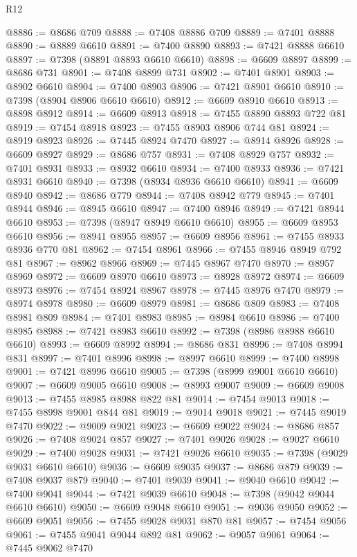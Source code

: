 \begin{lexlean}{R12}
\begin{coremodule}
{{{{{{{{{{{{{{{{{{{{{{{{{{{{{{{{{{{{{{{{{{{{{{{{{{{{{{{{{{{{{{{{{{{{{{{{{{{{{{{{{{@8886 := @8686 @709
@8888 := @7408 @8886 @709
@8889 := @7401 @8888
@8890 := @8889 @6610
@8891 := @7400 @8890
@8893 := @7421 @8888 @6610
@8897 := @7398 (@8891 @8893 @6610 @6610)
@8898 := @6609 @8897
@8899 := @8686 @731
@8901 := @7408 @8899 @731
@8902 := @7401 @8901
@8903 := @8902 @6610
@8904 := @7400 @8903
@8906 := @7421 @8901 @6610
@8910 := @7398 (@8904 @8906 @6610 @6610)
@8912 := @6609 @8910 @6610
@8913 := @8898 @8912
@8914 := @6609 @8913
@8918 := @7455 @8890 @8893 @722 @81
@8919 := @7454 @8918
@8923 := @7455 @8903 @8906 @744 @81
@8924 := @8919 @8923
@8926 := @7445 @8924 @7470
@8927 := @8914 @8926
@8928 := @6609 @8927
@8929 := @8686 @757
@8931 := @7408 @8929 @757
@8932 := @7401 @8931
@8933 := @8932 @6610
@8934 := @7400 @8933
@8936 := @7421 @8931 @6610
@8940 := @7398 (@8934 @8936 @6610 @6610)
@8941 := @6609 @8940
@8942 := @8686 @779
@8944 := @7408 @8942 @779
@8945 := @7401 @8944
@8946 := @8945 @6610
@8947 := @7400 @8946
@8949 := @7421 @8944 @6610
@8953 := @7398 (@8947 @8949 @6610 @6610)
@8955 := @6609 @8953 @6610
@8956 := @8941 @8955
@8957 := @6609 @8956
@8961 := @7455 @8933 @8936 @770 @81
@8962 := @7454 @8961
@8966 := @7455 @8946 @8949 @792 @81
@8967 := @8962 @8966
@8969 := @7445 @8967 @7470
@8970 := @8957 @8969
@8972 := @6609 @8970 @6610
@8973 := @8928 @8972
@8974 := @6609 @8973
@8976 := @7454 @8924 @8967
@8978 := @7445 @8976 @7470
@8979 := @8974 @8978
@8980 := @6609 @8979
@8981 := @8686 @809
@8983 := @7408 @8981 @809
@8984 := @7401 @8983
@8985 := @8984 @6610
@8986 := @7400 @8985
@8988 := @7421 @8983 @6610
@8992 := @7398 (@8986 @8988 @6610 @6610)
@8993 := @6609 @8992
@8994 := @8686 @831
@8996 := @7408 @8994 @831
@8997 := @7401 @8996
@8998 := @8997 @6610
@8999 := @7400 @8998
@9001 := @7421 @8996 @6610
@9005 := @7398 (@8999 @9001 @6610 @6610)
@9007 := @6609 @9005 @6610
@9008 := @8993 @9007
@9009 := @6609 @9008
@9013 := @7455 @8985 @8988 @822 @81
@9014 := @7454 @9013
@9018 := @7455 @8998 @9001 @844 @81
@9019 := @9014 @9018
@9021 := @7445 @9019 @7470
@9022 := @9009 @9021
@9023 := @6609 @9022
@9024 := @8686 @857
@9026 := @7408 @9024 @857
@9027 := @7401 @9026
@9028 := @9027 @6610
@9029 := @7400 @9028
@9031 := @7421 @9026 @6610
@9035 := @7398 (@9029 @9031 @6610 @6610)
@9036 := @6609 @9035
@9037 := @8686 @879
@9039 := @7408 @9037 @879
@9040 := @7401 @9039
@9041 := @9040 @6610
@9042 := @7400 @9041
@9044 := @7421 @9039 @6610
@9048 := @7398 (@9042 @9044 @6610 @6610)
@9050 := @6609 @9048 @6610
@9051 := @9036 @9050
@9052 := @6609 @9051
@9056 := @7455 @9028 @9031 @870 @81
@9057 := @7454 @9056
@9061 := @7455 @9041 @9044 @892 @81
@9062 := @9057 @9061
@9064 := @7445 @9062 @7470
}}}}}}}}}}}}}}}}}}}}}}}}}}}}}}}}}}}}}}}}}}}}}}}}}}}}}}}}}}}}}}}}}}}}}}}}}}}}}}}}}}
\end{coremodule}
\end{lexlean}
